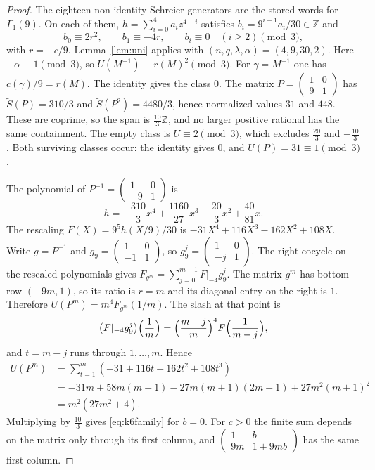 \documentclass[11pt]{article}
\theoremstyle{remark}
\newcommand{\tS}{\widetilde{S}}
\newcommand{\Z}{\mathbb{Z}}
\begin{document}
\begin{proof}
The eighteen non-identity Schreier generators are the stored words for \(\Gamma_1(9)\).
On each of them, \(h=\sum_{i=0}^{4}a_i z^{4-i}\) satisfies \(b_i=9^{i+1}a_i/30\in\Z\) and
\[
b_0\equiv 2r^2,\qquad b_1\equiv -4r,\qquad b_i\equiv 0\quad(i\ge 2)\pmod{3},
\]
with \(r=-c/9\).
Lemma~\ref{lem:uni} applies with \((n,q,\lambda,\alpha)=(4,9,30,2)\).
Here \(-\alpha\equiv 1\pmod{3}\), so \(U(M^{-1})\equiv r(M)^2\pmod{3}\).
For \(\gamma=M^{-1}\) one has \(c(\gamma)/9=r(M)\).
The identity gives the class \(0\).
The matrix \(P=\begin{pmatrix}1&0\\9&1\end{pmatrix}\) has \(\tS(P)=310/3\) and \(\tS(P^2)=4480/3\), hence normalized values \(31\) and \(448\).
These are coprime, so the span is \(\tfrac{10}{3}\Z\), and no larger positive rational has the same containment.
The empty class is \(U\equiv 2\pmod{3}\), which excludes \(\tfrac{20}{3}\) and \(-\tfrac{10}{3}\).
Both surviving classes occur: the identity gives \(0\), and \(U(P)=31\equiv 1\pmod{3}\).

The polynomial of \(P^{-1}=\begin{pmatrix}1&0\\-9&1\end{pmatrix}\) is
\[
h=-\frac{310}{3}x^4+\frac{1160}{27}x^3-\frac{20}{3}x^2+\frac{40}{81}x.
\]
The rescaling \(F(X)=9^5 h(X/9)/30\) is \(-31X^4+116X^3-162X^2+108X\).
Write \(g=P^{-1}\) and \(g_9=\begin{pmatrix}1&0\\-1&1\end{pmatrix}\), so \(g_9^j=\begin{pmatrix}1&0\\-j&1\end{pmatrix}\).
The right cocycle on the rescaled polynomials gives \(F_{g^m}=\sum_{j=0}^{m-1}F|_{-4}g_9^j\).
The matrix \(g^m\) has bottom row \((-9m,1)\), so its ratio is \(r=m\) and its diagonal entry on the right is \(1\).
Therefore \(U(P^m)=m^4 F_{g^m}(1/m)\).
The slash at that point is
\[
\bigl(F|_{-4}g_9^j\bigr)\Bigl(\frac1m\Bigr)=\Bigl(\frac{m-j}{m}\Bigr)^4 F\Bigl(\frac{1}{m-j}\Bigr),
\]
and \(t=m-j\) runs through \(1,\ldots,m\).
Hence
\begin{align*}
U(P^m)
&=\sum_{t=1}^{m}(-31+116t-162t^2+108t^3)\\
&=-31m+58m(m+1)-27m(m+1)(2m+1)+27m^2(m+1)^2\\
&=m^2(27m^2+4).
\end{align*}
Multiplying by \(\tfrac{10}{3}\) gives \eqref{eq:k6family} for \(b=0\).
For \(c>0\) the finite sum depends on the matrix only through its first column, and \(\begin{pmatrix}1&b\\9m&1+9mb\end{pmatrix}\) has the same first column.
\end{proof}
\end{document}
